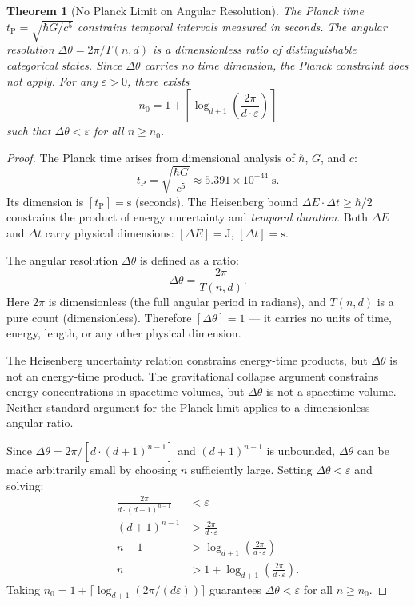 \documentclass[twocolumn,10pt,a4paper]{article}
\newtheorem{theorem}{Theorem}[section]
\theoremstyle{definition}
\theoremstyle{remark}
\newcommand{\tP}{t_{\mathrm{P}}}
\begin{document}
\begin{theorem}[No Planck Limit on Angular Resolution]
\label{thm:no_planck}
The Planck time $\tP = \sqrt{\hbar G / c^5}$ constrains temporal intervals measured in seconds. The angular resolution $\Delta\theta = 2\pi / T(n,d)$ is a dimensionless ratio of distinguishable categorical states. Since $\Delta\theta$ carries no time dimension, the Planck constraint does not apply. For any $\varepsilon > 0$, there exists
\begin{equation}
n_0 = 1 + \left\lceil \log_{d+1}\!\left(\frac{2\pi}{d \cdot \varepsilon}\right) \right\rceil
\end{equation}
such that $\Delta\theta < \varepsilon$ for all $n \geq n_0$.
\end{theorem}

\begin{proof}
The Planck time arises from dimensional analysis of $\hbar$, $G$, and $c$:
\begin{equation}
\tP = \sqrt{\frac{\hbar G}{c^5}} \approx 5.391 \times 10^{-44}\;\text{s}.
\end{equation}
Its dimension is $[\tP] = \text{s}$ (seconds). The Heisenberg bound $\Delta E \cdot \Delta t \geq \hbar/2$ constrains the product of energy uncertainty and \emph{temporal duration}. Both $\Delta E$ and $\Delta t$ carry physical dimensions: $[\Delta E] = \text{J}$, $[\Delta t] = \text{s}$.

The angular resolution $\Delta\theta$ is defined as a ratio:
\begin{equation}
\Delta\theta = \frac{2\pi}{T(n,d)}.
\end{equation}
Here $2\pi$ is dimensionless (the full angular period in radians), and $T(n,d)$ is a pure count (dimensionless). Therefore $[\Delta\theta] = 1$ --- it carries no units of time, energy, length, or any other physical dimension.

The Heisenberg uncertainty relation constrains energy-time products, but $\Delta\theta$ is not an energy-time product. The gravitational collapse argument constrains energy concentrations in spacetime volumes, but $\Delta\theta$ is not a spacetime volume. Neither standard argument for the Planck limit applies to a dimensionless angular ratio.

Since $\Delta\theta = 2\pi / [d \cdot (d+1)^{n-1}]$ and $(d+1)^{n-1}$ is unbounded, $\Delta\theta$ can be made arbitrarily small by choosing $n$ sufficiently large. Setting $\Delta\theta < \varepsilon$ and solving:
\begin{align}
\frac{2\pi}{d \cdot (d+1)^{n-1}} &< \varepsilon \nonumber \\
(d+1)^{n-1} &> \frac{2\pi}{d \cdot \varepsilon} \nonumber \\
n - 1 &> \log_{d+1}\!\left(\frac{2\pi}{d \cdot \varepsilon}\right) \nonumber \\
n &> 1 + \log_{d+1}\!\left(\frac{2\pi}{d \cdot \varepsilon}\right).
\end{align}
Taking $n_0 = 1 + \lceil \log_{d+1}(2\pi/(d\varepsilon)) \rceil$ guarantees $\Delta\theta < \varepsilon$ for all $n \geq n_0$.


\end{proof}
\end{document}
